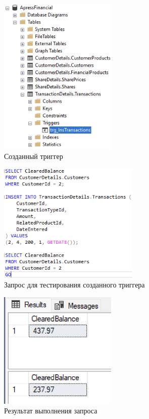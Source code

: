 \documentclass[a4paper, 14pt]{extarticle}
\begin{document}
\begin{figure}[H]
  \centering
  \includegraphics[width=0.5\textwidth]{images/task-1/2.png}
  \caption{Созданный триггер}
  \label{fig:task-1-2}
\end{figure}

\begin{figure}[H]
  \centering
  \includegraphics[width=0.6\textwidth]{images/task-1/3.png}
  \caption{Запрос для тестирования созданного триггера}
  \label{fig:task-1-3}
\end{figure}

\begin{figure}[H]
  \centering
  \includegraphics[width=0.5\textwidth]{images/task-1/4.png}
  \caption{Результат выполнения запроса}
  \label{fig:task-1-4}
\end{figure}
\end{document}

